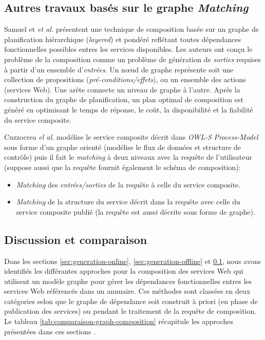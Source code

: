   \subsection{Autres travaux basés sur le graphe \textit{Matching}}
  \label{sec:autres-travaux}
  Samuel et \textit{et al.} \cite{samuel2011approach} présentent une
  technique de composition basée sur un graphe de planification
  hiérarchique (\textit{layered}) et pondéré reflétant toutes
  dépendances fonctionnelles possibles entres les services
  disponibles. Les auteurs ont conçu le problème de la composition
  comme un problème de génération de \textit{sorties} requises à partir
  d'un ensemble d'\textit{entrées}. Un nœud de graphe représente
  soit une collection de propositions
  (\textit{pré-conditions/effets}), ou un ensemble des actions
  (services Web). Une arête connecte un niveau de graphe à l'autre.
  Après la construction du graphe de planification, un plan optimal
  de composition est généré en optimisant le temps de réponse, le
  coût, la disponibilité et la fiabilité du service composite.\bigskip

  Cuzzocrea \emph{el al.} \cite{cuzzocrea2011flexible} modélise le
  service composite décrit dans \textit{OWL-S} \textit{Process-Model}
  sous forme d'un graphe orienté (modélise le flux de données et
  structure de contrôle) puis il fait le \textit{matching} à deux
  niveaux avec la requête de l'utilisateur (suppose aussi que la
  requête fournit également le schéma de composition):

  \SpecialItem
  \begin{itemize}
  \item \textit{Matching} des \textit{entrées/sorties} de la requête à
    celle du service composite.

  \item \textit{Matching} de la structure du service décrit dans la
    requête avec celle du service composite publié (la requête est
    aussi décrite sous forme de graphe).
  \end{itemize}
  \enddescription

  \subsection{Discussion et comparaison}
  \label{sec:discussion-comparaison}
  Dans les sections \ref{sec:generation-online},
  \ref{sec:generation-offline} et \ref{sec:autres-travaux}, nous avons
  identifiés les différantes approches pour la composition des
  services Web qui utilisent un modèle graphe pour gérer les
  dépendances fonctionnelles entres les services Web référencés dans
  un annuaire. Ces méthodes sont classées en deux catégories selon que
  le graphe de dépendance soit construit à priori (en phase de
  publication des services) ou pendant le traitement de la requête de
  composition. Le tableau \ref{tab:comparaison-graph-composition}
  récapitule les approches présentées dans ces sections . \bigskip

